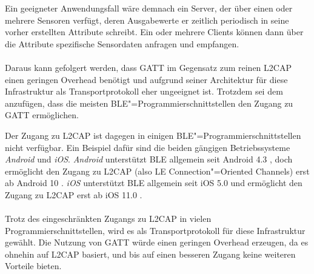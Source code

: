 Ein geeigneter Anwendungsfall wäre demnach ein Server, der über einen oder mehrere Sensoren verfügt, deren Ausgabewerte er zeitlich periodisch in seine vorher erstellten Attribute schreibt. Ein oder mehrere Clients können dann über die Attribute spezifische Sensordaten anfragen und empfangen.
\\\\
Daraus kann gefolgert werden, dass GATT im Gegensatz zum reinen L2CAP einen geringen Overhead benötigt und aufgrund seiner Architektur für diese Infrastruktur als Transportprotokoll eher ungeeignet ist. Trotzdem sei dem anzufügen, dass die meisten BLE"=Programmierschnittstellen den Zugang zu GATT ermöglichen.

Der Zugang zu L2CAP ist dagegen in einigen BLE"=Programmierschnittstellen nicht verfügbar. Ein Beispiel dafür sind die beiden gängigen Betriebssysteme \textit{Android} und \textit{iOS}. \textit{Android} unterstützt BLE allgemein seit Android 4.3 \cite{AndroidAppLayerSec}, doch ermöglicht den Zugang zu L2CAP (also LE Connection"=Oriented Channels) erst ab Android 10 \cite{AndroidCoC}. \textit{iOS} unterstützt BLE allgemein seit iOS 5.0 \cite{iOS_coreBluetooth} und ermöglicht den Zugang zu L2CAP erst ab iOS 11.0 \cite{iOS_CBL2CAPChannel}.
\\\\
Trotz des eingeschränkten Zugangs zu L2CAP in vielen Programmierschnittstellen, wird es als Transportprotokoll für diese Infrastruktur gewählt. Die Nutzung von GATT würde einen geringen Overhead erzeugen, da es ohnehin auf L2CAP basiert, und bis auf einen besseren Zugang keine weiteren Vorteile bieten.